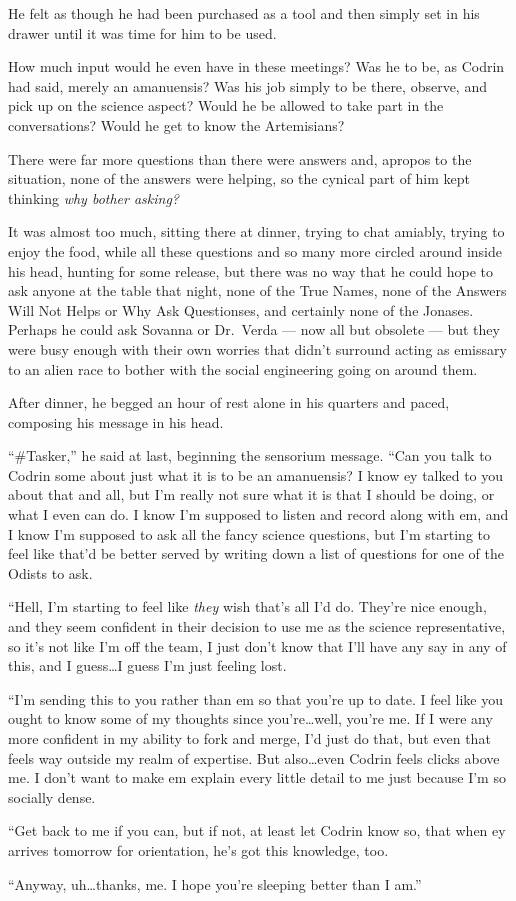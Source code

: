 He felt as though he had been purchased as a tool and then simply set in his drawer until it was time for him to be used.

How much input would he even have in these meetings? Was he to be, as Codrin had said, merely an amanuensis? Was his job simply to be there, observe, and pick up on the science aspect? Would he be allowed to take part in the conversations? Would he get to know the Artemisians?

There were far more questions than there were answers and, apropos to the situation, none of the answers were helping, so the cynical part of him kept thinking \emph{why bother asking?}

It was almost too much, sitting there at dinner, trying to chat amiably, trying to enjoy the food, while all these questions and so many more circled around inside his head, hunting for some release, but there was no way that he could hope to ask anyone at the table that night, none of the True Names, none of the Answers Will Not Helps or Why Ask Questionses, and certainly none of the Jonases. Perhaps he could ask Sovanna or Dr.~Verda — now all but obsolete — but they were busy enough with their own worries that didn't surround acting as emissary to an alien race to bother with the social engineering going on around them.

After dinner, he begged an hour of rest alone in his quarters and paced, composing his message in his head.

``\#Tasker,'' he said at last, beginning the sensorium message. ``Can you talk to Codrin some about just what it is to be an amanuensis? I know ey talked to you about that and all, but I'm really not sure what it is that I should be doing, or what I even can do. I know I'm supposed to listen and record along with em, and I know I'm supposed to ask all the fancy science questions, but I'm starting to feel like that'd be better served by writing down a list of questions for one of the Odists to ask.

``Hell, I'm starting to feel like \emph{they} wish that's all I'd do. They're nice enough, and they seem confident in their decision to use me as the science representative, so it's not like I'm off the team, I just don't know that I'll have any say in any of this, and I guess\ldots I guess I'm just feeling lost.

``I'm sending this to you rather than em so that you're up to date. I feel like you ought to know some of my thoughts since you're\ldots well, you're me. If I were any more confident in my ability to fork and merge, I'd just do that, but even that feels way outside my realm of expertise. But also\ldots even Codrin feels clicks above me. I don't want to make em explain every little detail to me just because I'm so socially dense.

``Get back to me if you can, but if not, at least let Codrin know so, that when ey arrives tomorrow for orientation, he's got this knowledge, too.

``Anyway, uh\ldots thanks, me. I hope you're sleeping better than I am.''
